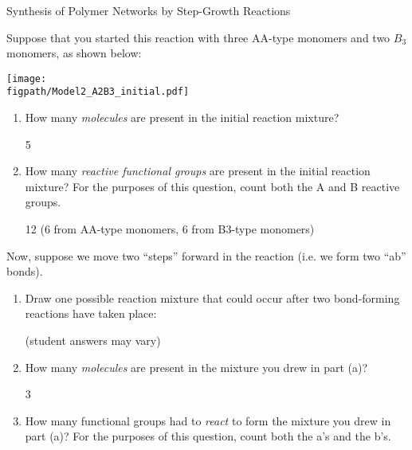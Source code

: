 \begin{activity}[extension]{Synthesis of Polymer Networks by Step-Growth Reactions}
\begin{ctqs}

	\question Suppose that you started this reaction with three AA-type monomers and two $B_3$ monomers, as shown below:
	
	\vspace{9pt}
		\centerline{\texttt{[image: \\figpath/Model2\_A2B3\_initial.pdf]}}
	
		\begin{enumerate}
			\item How many \emph{molecules} are present in the initial reaction mixture?
			
				\begin{solution}[0.25in]
					5
				\end{solution}
			
			\item How many \emph{reactive functional groups} are present in the initial reaction mixture?  For the purposes of this question, count both the A and B reactive groups.
			
				\begin{solution}[0.25in]
					12 (6 from AA-type monomers, 6 from B3-type monomers)
				\end{solution}
			
		\end{enumerate}
		
	\question Now, suppose we move two ``steps'' forward in the reaction (i.e. we form two ``ab'' bonds).
	
		\begin{enumerate}
		
			\item Draw one possible reaction mixture that could occur after two bond-forming reactions have taken place:
			
				\begin{solution}[1.25in]
				
					(student answers may vary)
					
				\end{solution}
			\item How many \emph{molecules} are present in the mixture you drew in part (a)?
			
				\begin{solution}[0.5in]
					3
				\end{solution}
			
			\item How many functional groups had to \emph{react} to form the mixture you drew in part (a)?  For the purposes of this question, count both the a's and the b's.
			

\end{enumerate}
\end{ctqs}
\end{activity}
